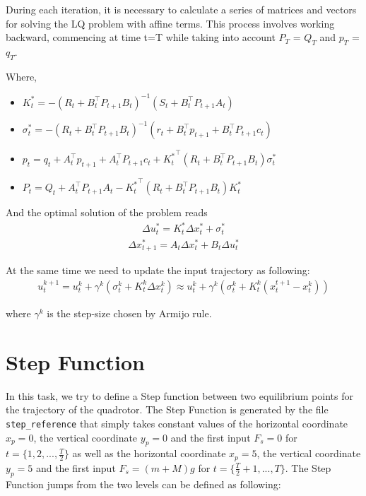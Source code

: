 \documentclass[a4paper,11pt,oneside]{book}
\begin{document}
During each iteration, it is necessary to calculate a series of matrices and vectors for solving the LQ problem with affine terms. This process involves working backward, commencing at time t=T while taking into account $P_T$ = $Q_T$ and $p_T$ = $q_T$.

Where,
\begin{itemize}
    \item $K^*_t = -(R_t+B_t^\top P_{t+1}B_t)^{-1}(S_t+B_t^\top P_{t+1}A_t)$
    \item $\sigma^*_t = -(R_t+B_t^\top P_{t+1}B_t)^{-1}(r_t+B_t^\top p_{t+1}+B_t^\top P_{t+1}c_t)$
    \item $p_t = q_t+A_t^\top p_{t+1}+A_t^\top P_{t+1}c_t+{K^*_t}^\top (R_t+B_t^\top P_{t+1}B_t) \sigma^*_t$
    \item $P_t = Q_t+A_t^\top P_{t+1}A_t-{K^*_t}^\top (R_t+B_t^\top P_{t+1}B_t)K^*_t$
\end{itemize}

And the optimal solution of the problem reads
\begin{equation*}
\begin{aligned}
\Delta u^*_t=K^*_t\Delta x^*_t+\sigma^*_t
\end{aligned}
\end{equation*}
\begin{equation*}
\begin{aligned}
\Delta x^*_{t+1}=A_t\Delta x^*_t+B_t\Delta u^*_t
\end{aligned}
\end{equation*}

At the same time we need to update the input trajectory as following:
\begin{equation*}
\begin{aligned}
u_t^{k+1}=u_t^{k}+\gamma^{k}(\sigma_t^k+K_t^{k}\Delta x^{k}_t)\approx u_t^{k}+\gamma^{k}(\sigma_t^k+K_t^{k}(x_t^{t+1}-x_t^{k}))
\end{aligned}
\end{equation*}

where $\gamma^{k}$ is the step-size chosen by Armijo rule.

\section{Step Function}

In this task, we try to define a Step function between two equilibrium points for the trajectory of the quadrotor. The Step Function is generated by the file \texttt{step\_reference} that simply takes constant values of the horizontal coordinate $x_{p}=0$, the vertical coordinate $y_{p}=0$ and the first input $F_{s}=0$ for $ t = \{1, 2, ..., \frac{T}{2}\}$ as well as the horizontal coordinate $x_{p}=5$, the vertical coordinate $y_{p}=5$ and the first input $F_{s}=(m+M)g$ for $ t = \{\frac{T}{2}+1, ..., T\}$. The Step Function jumps from the two levels can be defined as following:
\end{document}
